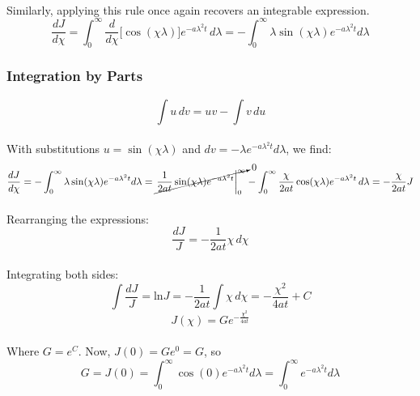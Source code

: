 \paragraph{}
Similarly, applying this rule once again recovers an integrable expression.
\begin{equation*}
\frac{dJ}{d\chi} = \int_{0}^{\infty} \frac{d}{d\chi} \big[\cos(\chi\lambda) \big] e^{-a \lambda^2 t} \, d\lambda = -\int_{0}^{\infty} \lambda \sin(\chi\lambda) e^{-a \lambda^2 t} d\lambda
\end{equation*}

\subsubsection*{Integration by Parts}
\begin{equation*}
\label{eq:ibp}
\int u \, dv = uv - \int v \, du
\end{equation*}
\paragraph{}
With substitutions $u = \sin(\chi\lambda)$ and $dv = -\lambda e^{-a \lambda^2 t} d\lambda$, we find: 
\begin{equation*}
\frac{dJ}{d\chi} = -\int_{0}^{\infty} \lambda \sin(\chi\lambda) e^{-a \lambda^2 t} d\lambda = \cancelto{0}{\left. \frac{1}{2at} \sin(\chi \lambda)e^{-a \lambda^2 t} \right|_0^{\infty}} - \int_{0}^{\infty} \frac{\chi}{2 a t} \cos( \chi \lambda) e^{-a \lambda^2 t} \, d\lambda = - \frac{\chi}{2at} J
\end{equation*}
\paragraph{}
Rearranging the expressions:
\begin{equation*}
\frac{d J}{J} = - \frac{1}{2at} \chi \, d \chi
\end{equation*}
\paragraph{}
Integrating both sides:
\begin{equation*}
\int \frac{d J}{J} = \text{ln}J = - \frac{1}{2at} \int \chi \, d \chi = -\frac{\chi^2}{4 a t} + C
\end{equation*}
\begin{equation*}
J(\chi) = Ge^{-\frac{\chi^2}{4at}}
\end{equation*}
\paragraph{}    
Where $G=e^C$. Now, $J(0)=Ge^0=G$, so
\begin{equation}
\label{eq:gi}
G = J(0) = \int_{0}^{\infty} \cos(0) e^{-a \lambda^2 t} d\lambda = \int_{0}^{\infty} e^{-a \lambda^2 t} d\lambda
\end{equation}

